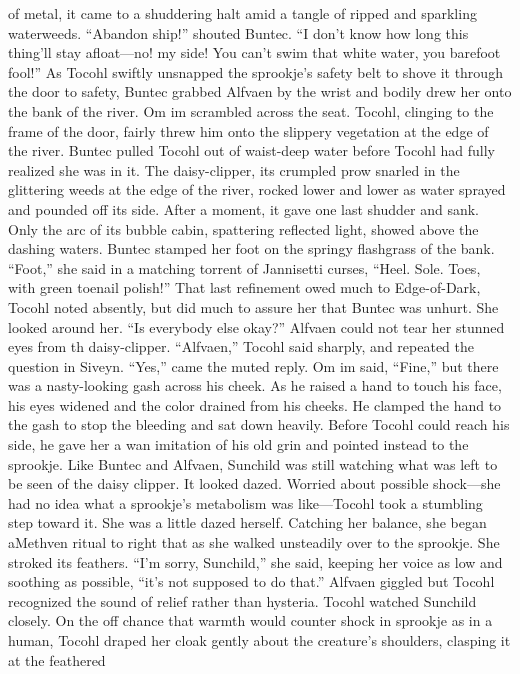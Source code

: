 \documentclass[9pt]{article}
\begin{document}
of metal, it came to a shuddering halt amid a tangle of ripped and sparkling waterweeds.
“Abandon ship!” shouted Buntec. “I don’t know how long this thing’ll stay afloat—no! my side! You
can’t swim that white water, you barefoot fool!”
As Tocohl swiftly unsnapped the sprookje’s safety belt to shove it through the door to safety, Buntec
grabbed Alfvaen by the wrist and bodily drew her onto the bank of the river.
Om im scrambled across the seat. Tocohl, clinging to the frame of the door, fairly threw him onto the
slippery vegetation at the edge of the river. Buntec pulled Tocohl out of waist-deep water before Tocohl
had fully realized she was in it.
The daisy-clipper, its crumpled prow snarled in the glittering weeds at the edge of the river, rocked
lower and lower as water sprayed and pounded off its side. After a moment, it gave one last shudder and
sank. Only the arc of its bubble cabin, spattering reflected light, showed above the dashing waters.
Buntec stamped her foot on the springy flashgrass of the bank. “Foot,” she said in a matching torrent
of Jannisetti curses, “Heel. Sole. Toes, with green toenail polish!”
That last refinement owed much to Edge-of-Dark, Tocohl noted absently, but did much to assure her
that Buntec was unhurt. She looked around her. “Is everybody else okay?”
Alfvaen could not tear her stunned eyes from th daisy-clipper. “Alfvaen,” Tocohl said sharply, and
repeated the question in Siveyn.
“Yes,” came the muted reply.
Om im said, “Fine,” but there was a nasty-looking gash across his cheek. As he raised a hand to
touch his face, his eyes widened and the color drained from his cheeks. He clamped the hand to the gash
to stop the bleeding and sat down heavily.
Before Tocohl could reach his side, he gave her a wan imitation of his old grin and pointed instead to
the sprookje. Like Buntec and Alfvaen, Sunchild was still watching what was left to be seen of the daisy
clipper. It looked dazed.
Worried about possible shock—she had no idea what a sprookje’s metabolism was like—Tocohl
took a stumbling step toward it. She was a little dazed herself. Catching her balance, she began aMethven ritual to right that as she walked unsteadily over to the sprookje.
She stroked its feathers. “I’m sorry, Sunchild,” she said, keeping her voice as low and soothing as
possible, “it’s not supposed to do that.” Alfvaen giggled but Tocohl recognized the sound of relief rather
than hysteria.
Tocohl watched Sunchild closely. On the off chance that warmth would counter shock in sprookje as
in a human, Tocohl draped her cloak gently about the creature’s shoulders, clasping it at the feathered
\end{document}
